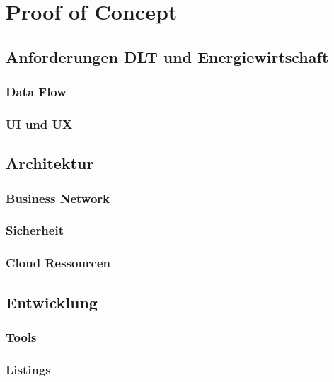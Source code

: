\section{Proof of Concept}

\subsection{Anforderungen DLT und Energiewirtschaft}

\subsubsection{Data Flow}

\subsubsection{UI und UX}

\subsection{Architektur}

\subsubsection{Business Network}

\subsubsection{Sicherheit}

\subsubsection{Cloud Ressourcen}

\subsection{Entwicklung}

\subsubsection{Tools}

\subsubsection{Listings}

\newpage